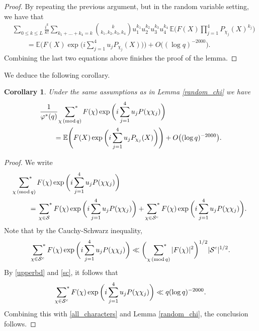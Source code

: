\documentclass[12pt, reqno]{amsart}
\renewcommand{\pmod}[1]{\,(\mathrm{mod}\,#1)}
\newcommand{\E}{\mathbb{E}}
\newtheorem{corollary}[theorem]{Corollary}
\numberwithin{equation}{section}
\numberwithin{theorem}{section}
\numberwithin{equation}{section}
\def\sumstar{\sideset{}{^*}\sum}
\begin{document}
\begin{proof}
By repeating the previous argument, but in the random variable setting, we have that
\begin{align*}
 & \sum_{0 \leq k \leq L} \frac{i^k}{k!} \sum_{k_1+\ldots +k_4=k} {k \choose k_1,k_2,k_3,k_4} u_1^{k_1} u_2^{k_2} u_3^{k_3} u_4^{k_4} \, \E\bigg(  F(X) \prod_{j=1}^4 P_{\chi_j}(X)^{k_j}\bigg)\\
  &\qquad= \E \Bigg( F(X) \exp\bigg(  i\sum_{j=1}^4 u_jP_{\chi_j}(X)\bigg) \Bigg) + O \big((\log q)^{-2000}\big).
\end{align*}
Combining the last two equations above finishes the proof of the lemma.
\end{proof}


We deduce the following corollary.

\begin{corollary}
\label{fchirandom}
    Under the same assumptions as in Lemma \ref{random_chi} we have 
\begin{align*}
    &\frac{1}{\varphi^{*}(q)}\ \sumstar_{\chi \pmod q} F(\chi)  
\exp\bigg(  i\sum_{j=1}^4 u_jP(\chi\chi_j)\bigg)\\
&\qquad= \E \Bigg( F(X) \exp\bigg(  i\sum_{j=1}^4 u_jP_{\chi_j}(X)\bigg)\Bigg)+O\big(  (\log q)^{-2000}\big).
\end{align*}
\end{corollary}

\begin{proof}
    We write
    \begin{align}
        &\sumstar_{\chi \pmod q}  F(\chi)  
\exp\bigg(  i\sum_{j=1}^4 u_jP(\chi\chi_j)\bigg)  \nonumber  \\
&\qquad= \sumstar_{\chi \in \mathcal{S}}  F(\chi)  
\exp\bigg(  i\sum_{j=1}^4 u_jP(\chi\chi_j)\bigg) + \sumstar_{\chi \in \mathcal{S}^c}  F(\chi)  
\exp\bigg(  i\sum_{j=1}^4 u_jP(\chi\chi_j)\bigg).\label{all_characters}
    \end{align}
    Note that by the Cauchy-Schwarz inequality, 
    \begin{align*}
     \sumstar_{\chi \in \mathcal{S}^c}  F(\chi)  
\exp\bigg(  i\sum_{j=1}^4 u_jP(\chi\chi_j)\bigg) \ll \bigg(\  \sumstar_{\chi \pmod q} |F(\chi)|^2\bigg)^{1/2} |\mathcal{S}^c|^{1/2}.   
    \end{align*}
    By \eqref{upperbd} and \eqref{sc}, it follows that
    $$ 
     \sumstar_{\chi \in \mathcal{S}^c}  F(\chi)  
\exp\bigg(  i\sum_{j=1}^4 u_jP(\chi\chi_j)\bigg) \ll  q (\log q)^{-2000}. $$
Combining this with \eqref{all_characters} and Lemma \ref{random_chi}, the conclusion follows.
\end{proof}
\end{document}

